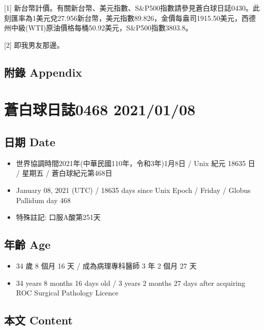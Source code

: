 \documentclass[
]{article}
\providecommand{\tightlist}{%
  \setlength{\itemsep}{0pt}\setlength{\parskip}{0pt}}
\begin{document}
{[}1{]}
新台幣計價。有關新台幣、美元指數、S\&P500指數請參見蒼白球日誌0430。此刻匯率為1美元兌27.956新台幣，美元指數89.826，金價每盎司1915.50美元，西德州中級(WTI)原油價格每桶50.92美元，S\&P500指數3803.8。

{[}2{]} 即我男友那邊。

\hypertarget{ux9644ux9304-appendix-6}{%
\subsection{附錄 Appendix}\label{ux9644ux9304-appendix-6}}

\hypertarget{ux84bcux767dux7403ux65e5ux8a8c0468-20210108}{%
\section{蒼白球日誌0468
2021/01/08}\label{ux84bcux767dux7403ux65e5ux8a8c0468-20210108}}

\hypertarget{ux65e5ux671f-date-7}{%
\subsection{日期 Date}\label{ux65e5ux671f-date-7}}

\begin{itemize}
\tightlist
\item
  世界協調時間2021年(中華民國110年，令和3年)1月8日 / Unix 紀元 18635 日
  / 星期五 / 蒼白球紀元第468日
\item
  January 08, 2021 (UTC) / 18635 days since Unix Epoch / Friday / Globus
  Pallidum day 468
\item
  特殊註記: 口服A酸第251天
\end{itemize}

\hypertarget{ux5e74ux9f61-age-7}{%
\subsection{年齡 Age}\label{ux5e74ux9f61-age-7}}

\begin{itemize}
\tightlist
\item
  34 歲 8 個月 16 天 / 成為病理專科醫師 3 年 2 個月 27 天
\item
  34 years 8 months 16 days old / 3 years 2 months 27 days after
  acquiring ROC Surgical Pathology Licence
\end{itemize}

\hypertarget{ux672cux6587-content-7}{%
\subsection{本文 Content}\label{ux672cux6587-content-7}}
\end{document}
